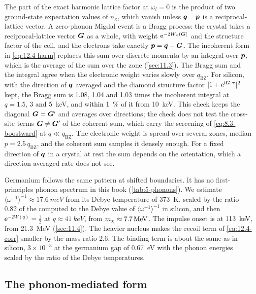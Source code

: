 The part of the exact harmonic lattice factor at $\omega_l = 0$ is the product of two ground-state expectation values of $n_\kappa$, which vanish unless $\bm{q} - \bm{p}$ is a reciprocal-lattice vector. A zero-phonon Migdal event is a Bragg process: the crystal takes a reciprocal-lattice vector $\bm{G}$ as a whole, with weight $\mathrm{e}^{-2W_\kappa(\bm{G})}$ and the structure factor of the cell, and the electrons take exactly $\bm{p} = \bm{q} - \bm{G}$. The incoherent form in \cref{eq:12.4-harm} replaces this sum over discrete momenta by an integral over $\bm{p}$, which is the average of the sum over the zone (\cref{sec:11.3}). The Bragg sum and the integral agree when the electronic weight varies slowly over $q_{\mathrm{BZ}}$. For silicon, with the direction of $\bm{q}$ averaged and the diamond structure factor $|1 + \mathrm{e}^{\mathrm{i}\bm{G}\cdot\bm{\tau}}|^2$ kept, the Bragg sum is 1.08, 1.04 and 1.03 times the incoherent integral at $q = 1.5$, 3 and \SI{5}{keV}, and within \SI{1}{\percent} of it from \SI{10}{keV}. This check keeps the diagonal $\bm{G} = \bm{G}'$ and averages over directions; the check does not test the cross-site terms $\bm{G} \neq \bm{G}'$ of the coherent sum, which carry the screening of \cref{eq:8.3-boostward} at $q \ll q_{\mathrm{BZ}}$. The electronic weight is spread over several zones, median $p = 2.5\,q_{\mathrm{BZ}}$, and the coherent sum samples it densely enough. For a fixed direction of $\bm{q}$ in a crystal at rest the sum depends on the orientation, which a direction-averaged rate does not see.

Germanium follows the same pattern at shifted boundaries. It has no first-principles phonon spectrum in this book (\cref{tab:5-phonons}). We estimate $\langle\omega^{-1}\rangle^{-1} \approx \SI{17.6}{meV}$ from its Debye temperature of \SI{373}{K}, scaled by the ratio 0.82 of the computed to the Debye value of $\langle\omega^{-1}\rangle^{-1}$ in silicon, and then $\ee^{-2W(q)} = \frac12$ at $q \approx \SI{41}{keV}$, from $m_{\chi} \approx \SI{7.7}{MeV}$. The impulse onset is at \SI{113}{keV}, from \SI{21.3}{MeV} (\cref{sec:11.4}). The heavier nucleus makes the recoil term of \cref{eq:12.4-corr} smaller by the mass ratio 2.6. The binding term is about the same as in silicon, $3\times10^{-3}$ at the germanium gap of \SI{0.67}{eV} with the phonon energies scaled by the ratio of the Debye temperatures.

\subsection{The phonon-mediated form}\label{sec:12.4-virtual}

